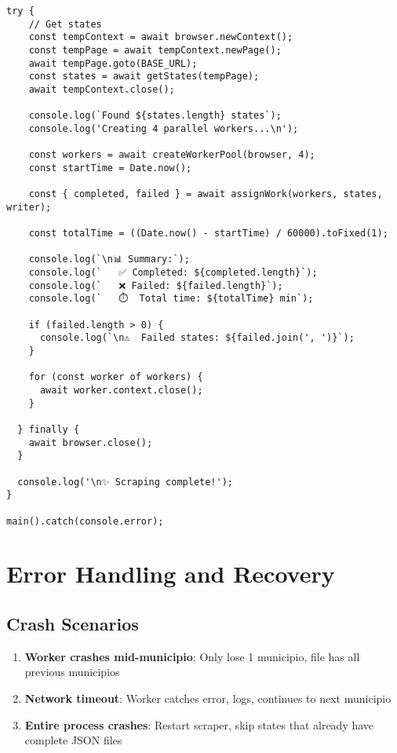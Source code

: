\documentclass[11pt,a4paper]{article}
\begin{document}
\begin{lstlisting}[caption={Full Parallel + Stream Implementation}]
  try {
    // Get states
    const tempContext = await browser.newContext();
    const tempPage = await tempContext.newPage();
    await tempPage.goto(BASE_URL);
    const states = await getStates(tempPage);
    await tempContext.close();

    console.log(`Found ${states.length} states`);
    console.log('Creating 4 parallel workers...\n');

    const workers = await createWorkerPool(browser, 4);
    const startTime = Date.now();

    const { completed, failed } = await assignWork(workers, states, writer);

    const totalTime = ((Date.now() - startTime) / 60000).toFixed(1);

    console.log(`\n📊 Summary:`);
    console.log(`   ✅ Completed: ${completed.length}`);
    console.log(`   ❌ Failed: ${failed.length}`);
    console.log(`   ⏱️  Total time: ${totalTime} min`);

    if (failed.length > 0) {
      console.log(`\n⚠️  Failed states: ${failed.join(', ')}`);
    }

    for (const worker of workers) {
      await worker.context.close();
    }

  } finally {
    await browser.close();
  }

  console.log('\n✨ Scraping complete!');
}

main().catch(console.error);
\end{lstlisting}

\section{Error Handling and Recovery}

\subsection{Crash Scenarios}

\begin{enumerate}
    \item \textbf{Worker crashes mid-municipio}: Only lose 1 municipio, file has all previous municipios
    \item \textbf{Network timeout}: Worker catches error, logs, continues to next municipio
    \item \textbf{Entire process crashes}: Restart scraper, skip states that already have complete JSON files
\end{enumerate}
\end{document}
